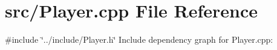 \section{src/\-Player.cpp \-File \-Reference}
\label{_player_8cpp}
{\ttfamily \#include \char`\"{}../include/\-Player.\-h\char`\"{}}\*
\-Include dependency graph for \-Player.\-cpp\-:
